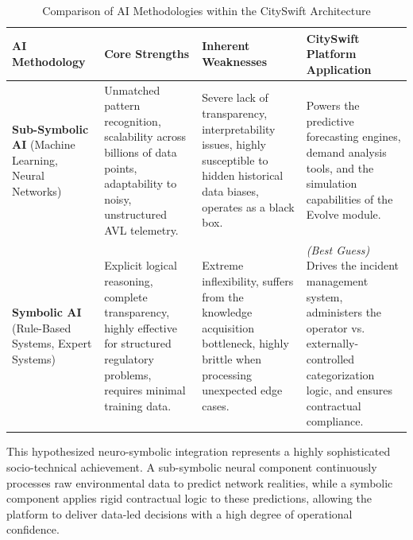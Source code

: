 \documentclass[]
{UCD_CS_41820_Report}
\begin{document}
\begin{table}[h!]
  \centering
  \begin{tabular}{|p{3.2cm}|p{3.5cm}|p{3.5cm}|p{4cm}|}
    \hline
    \textbf{AI Methodology}                                                                                                                 & \textbf{Core Strengths} & \textbf{Inherent Weaknesses} & \textbf{CitySwift Platform Application} \\
    \hline
    \textbf{Sub-Symbolic AI} \newline (Machine Learning, Neural Networks)                                                                   &
    Unmatched pattern recognition, scalability across billions of data points, adaptability to noisy, unstructured AVL telemetry.           &
    Severe lack of transparency, interpretability issues, highly susceptible to hidden historical data biases, operates as a black box.     &
    Powers the predictive forecasting engines, demand analysis tools, and the simulation capabilities of the Evolve module.                                                                                                                    \\
    \hline
    \textbf{Symbolic AI} \newline (Rule-Based Systems, Expert Systems)                                                                      &
    Explicit logical reasoning, complete transparency, highly effective for structured regulatory problems, requires minimal training data. &
    Extreme inflexibility, suffers from the knowledge acquisition bottleneck, highly brittle when processing unexpected edge cases.         &
    \textit{(Best Guess)} Drives the incident management system, administers the operator vs. externally-controlled categorization logic, and ensures contractual compliance.                                                                  \\
    \hline
  \end{tabular}
  \caption{Comparison of AI Methodologies within the CitySwift Architecture}
\end{table}

This hypothesized neuro-symbolic integration represents a highly sophisticated socio-technical achievement. A sub-symbolic neural component continuously processes raw environmental data to predict network realities, while a symbolic component applies rigid contractual logic to these predictions, allowing the platform to deliver data-led decisions with a high degree of operational confidence.
\end{document}
